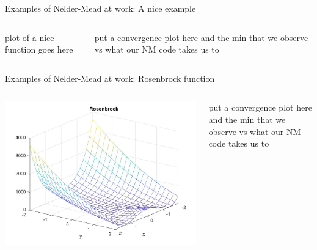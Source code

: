 \documentclass{beamer}
\begin{document}
\begin{frame}{Examples of Nelder-Mead at work: A nice example}
\begin{columns}
\begin{column}{0.4\linewidth}
	plot of a nice function goes here	
\end{column}
\begin{column}{0.58\linewidth}
	put a convergence plot here and the min that we observe vs what our NM code takes us to
\end{column}
\end{columns}
\end{frame}

\begin{frame}{Examples of Nelder-Mead at work: Rosenbrock function}
\begin{columns}
\begin{column}{0.4\linewidth}
	\includegraphics[width=0.95\linewidth]{rosenbrockPlotS1}
\end{column}
\begin{column}{0.58\linewidth}
	put a convergence plot here and the min that we observe vs what our NM code takes us to
\end{column}
\end{columns}
\end{frame}
\end{document}
